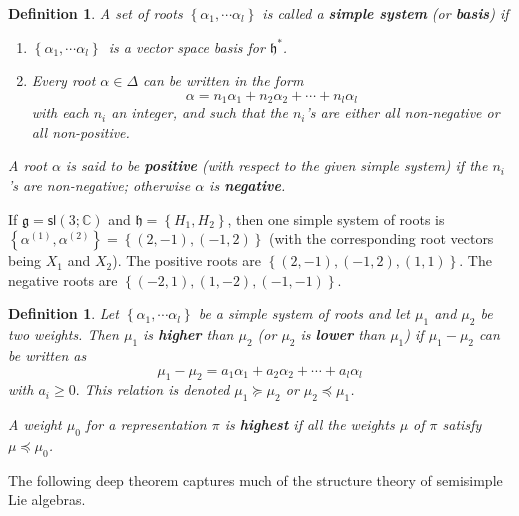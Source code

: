 \documentclass[12pt]{amsbook}
\let \frak = \mathfrak
\theoremstyle{plain}
\newtheorem{definition}[theorem]{Definition}
\numberwithin{equation}{chapter}
\numberwithin{theorem}{chapter}
\begin{document}
\begin{definition}
A set of roots $\left\{  \alpha_{1},\cdots\alpha_{l}\right\}  $ is called a
\textbf{simple system} (or \textbf{basis}) if

\begin{enumerate}
\item $\left\{  \alpha_{1},\cdots\alpha_{l}\right\}  \,$ is a vector space
basis for $\frak{h}^{\ast}$.

\item  Every root $\alpha\in\Delta$ can be written in the form
\[
\alpha=n_{1}\alpha_{1}+n_{2}\alpha_{2}+\cdots+n_{l}\alpha_{l}%
\]
with each $n_{i}$ an integer, and such that the $n_{i}$'s are either all
non-negative or all non-positive.
\end{enumerate}

A root $\alpha$ is said to be \textbf{positive} (with respect to the given
simple system) if the $n_{i}$'s are non-negative; otherwise $\alpha$ is
\textbf{negative}.
\end{definition}

If $\frak{g}=\mathsf{sl}\left(  3;\mathbb{C}\right)  $ and $\frak{h=}\left\{
H_{1},H_{2}\right\}  $, then one simple system of roots is $\left\{
\alpha^{(1)},\alpha^{(2)}\right\}  =\left\{  \left(  2,-1\right)  ,\left(
-1,2\right)  \right\}  $ (with the corresponding root vectors being $X_{1}$
and $X_{2}$). The positive roots are $\left\{  \left(  2,-1\right)  ,\left(
-1,2\right)  ,\left(  1,1\right)  \right\}  $. The negative roots are
$\left\{  \left(  -2,1\right)  ,\left(  1,-2\right)  ,\left(  -1,-1\right)
\right\}  $.

\begin{definition}
Let $\left\{  \alpha_{1},\cdots\alpha_{l}\right\}  $ be a simple system of
roots and let $\mu_{1}$ and $\mu_{2}$ be two weights. Then $\mu_{1}$ is
\textbf{higher} than $\mu_{2}$ (or $\mu_{2}$ is \textbf{lower} than $\mu_{1}$)
if $\mu_{1}-\mu_{2}$ can be written as
\[
\mu_{1}-\mu_{2}=a_{1}\alpha_{1}+a_{2}\alpha_{2}+\cdots+a_{l}\alpha_{l}%
\]
with $a_{i}\geq0.$ This relation is denoted $\mu_{1}\succeq\mu_{2}$ or
$\mu_{2}\preceq\mu_{1}$.

A weight $\mu_{0}$ for a representation $\pi$ is \textbf{highest} if all the
weights $\mu$ of $\pi$ satisfy $\mu\preceq\mu_{0}$.
\end{definition}

The following deep theorem captures much of the structure theory of semisimple
Lie algebras.
\end{document}
